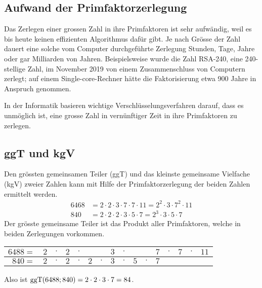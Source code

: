 \subsection{Aufwand der Primfaktorzerlegung}

Das Zerlegen einer grossen Zahl in ihre Primfaktoren ist sehr aufwändig, weil es bis heute keinen effizienten Algorithmus dafür gibt. Je nach Grösse der Zahl dauert eine solche vom Computer durchgeführte Zerlegung Stunden, Tage, Jahre oder gar Milliarden von Jahren. Beispielsweise wurde die Zahl RSA-240, eine 240-stellige Zahl, im November 2019 von einem Zusammenschluss von Computern zerlegt; auf einem Single-core-Rechner hätte die Faktorisierung etwa 900 Jahre in Anspruch genommen.

In der Informatik basieren wichtige Verschlüsselungsverfahren darauf, dass es unmöglich ist, eine grosse Zahl in vernünftiger Zeit in ihre Primfaktoren zu zerlegen.

\subsection{ggT und kgV}

Den grössten gemeinsamen Teiler (ggT) und das kleinste gemeinsame Vielfache (kgV) zweier Zahlen kann mit Hilfe der Primfaktorzerlegung der beiden Zahlen ermittelt werden.
\begin{align*}
  6468 &= 2\cdot2\cdot3\cdot7\cdot7\cdot11 = 2^{2}\cdot 3\cdot 7^{2}\cdot 11 \\
   840 &= 2\cdot2\cdot2\cdot3\cdot5\cdot7 = 2^{3}\cdot 3\cdot 5\cdot 7
\end{align*}
Der grösste gemeinsame Teiler ist das Produkt aller Primfaktoren, welche in beiden Zerlegungen vorkommen.
\begin{center}
  \renewcommand{\arraystretch}{1.3}
  \begin{tabular}{rccccccccccccccc}
    \hline
      $6488=$ & \cellcolor{lightgreen} $2$ & $\cdot$ & \cellcolor{lightgreen} $2$ & $\cdot$ & & & \cellcolor{lightgreen} $3$ & $\cdot$ & & & \cellcolor{lightgreen} $7$ & $\cdot$ & $7$ & $\cdot$ & $11$ \\
    \hline
       $840=$ & \cellcolor{lightgreen} $2$ & $\cdot$ & \cellcolor{lightgreen} $2$ & $\cdot$ & $2$ & $\cdot$ & \cellcolor{lightgreen} $3$ & $\cdot$ & $5$ & $\cdot$ & \cellcolor{lightgreen} $7$ & & & & \\
    \hline
  \end{tabular}
\end{center}
Also ist $\operatorname{ggT}(6488;840) = 2\cdot2\cdot 3\cdot 7 = 84$.

